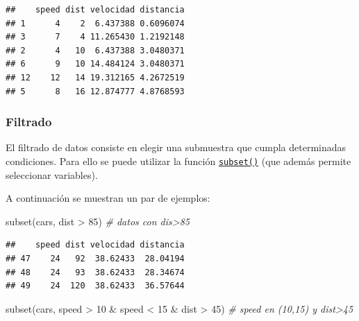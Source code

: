 \documentclass[
]{book}
\newenvironment{Shaded}{\begin{snugshade}}{\end{snugshade}}
\newcommand{\CommentTok}[1]{\textcolor[rgb]{0.56,0.35,0.01}{\textit{#1}}}
\newcommand{\DecValTok}[1]{\textcolor[rgb]{0.00,0.00,0.81}{#1}}
\newcommand{\FunctionTok}[1]{\textcolor[rgb]{0.00,0.00,0.00}{#1}}
\newcommand{\NormalTok}[1]{#1}
\newcommand{\OtherTok}[1]{\textcolor[rgb]{0.56,0.35,0.01}{#1}}
\newcommand{\SpecialCharTok}[1]{\textcolor[rgb]{0.00,0.00,0.00}{#1}}
\theoremstyle{break}
\theoremstyle{nonumberplain}
\begin{document}
\begin{Shaded}
\end{Shaded}

\begin{verbatim}
##    speed dist velocidad distancia
## 1      4    2  6.437388 0.6096074
## 3      7    4 11.265430 1.2192148
## 2      4   10  6.437388 3.0480371
## 6      9   10 14.484124 3.0480371
## 12    12   14 19.312165 4.2672519
## 5      8   16 12.874777 4.8768593
\end{verbatim}

\hypertarget{filtrado}{%
\subsubsection{Filtrado}\label{filtrado}}

El filtrado de datos consiste en
elegir una submuestra que cumpla determinadas condiciones. Para ello se
puede utilizar la función \href{https://www.rdocumentation.org/packages/base/versions/3.6.1/topics/subset}{\texttt{subset()}}
(que además permite seleccionar variables).

A continuación se muestran un par de ejemplos:

\begin{Shaded}
\begin{Highlighting}[]
\FunctionTok{subset}\NormalTok{(cars, dist }\SpecialCharTok{\textgreater{}} \DecValTok{85}\NormalTok{) }\CommentTok{\# datos con dis\textgreater{}85}
\end{Highlighting}
\end{Shaded}

\begin{verbatim}
##    speed dist velocidad distancia
## 47    24   92  38.62433  28.04194
## 48    24   93  38.62433  28.34674
## 49    24  120  38.62433  36.57644
\end{verbatim}

\begin{Shaded}
\begin{Highlighting}[]
\FunctionTok{subset}\NormalTok{(cars, speed }\SpecialCharTok{\textgreater{}} \DecValTok{10} \SpecialCharTok{\&}\NormalTok{ speed }\SpecialCharTok{\textless{}} \DecValTok{15} \SpecialCharTok{\&}\NormalTok{ dist }\SpecialCharTok{\textgreater{}} \DecValTok{45}\NormalTok{) }\CommentTok{\# speed en (10,15) y dist\textgreater{}45}
\end{Highlighting}
\end{Shaded}
\end{document}
